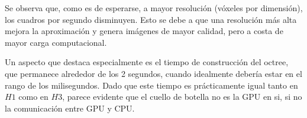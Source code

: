 Se observa que, como es de esperarse, a mayor resolución (vóxeles por dimensión), los cuadros por segundo disminuyen.
Esto se debe a que una resolución más alta mejora la aproximación y genera imágenes de mayor calidad, pero a costa de mayor carga computacional.

Un aspecto que destaca especialmente es el tiempo de construcción del octree, que permanece alrededor de los 2 segundos, cuando idealmente debería estar en el rango de los milisegundos.
Dado que este tiempo es prácticamente igual tanto en $H1$ como en $H3$, parece evidente que el cuello de botella no es la GPU en si, si no la comunicación entre GPU y CPU.

